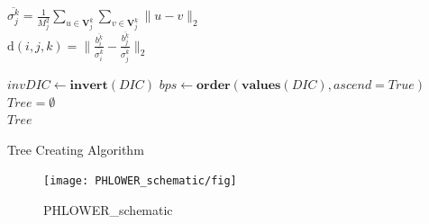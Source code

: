 \begin{algorithm}
{{{                $\overline{\sigma^k_j} = \frac{1}{M_j^2} \sum_{u \in \mathbf{V}^k_j}  \sum_{v \in \mathbf{V}^k_j} \Big\|u-v\Big\|_2$\\
                $\mathrm{d}(i,j,k) = \Bigg\| \frac{ \overline{b^k_i} }{ \overline{\sigma^k_i}} - \frac{ \overline{b^k_j} }{ \overline{\sigma^k_j}} \Bigg\|_2$\\
            }
        }
    }
    
    $invDIC \gets \textbf{invert}(DIC)$ 
    $bps \gets \textbf{order}(\textbf{values}(DIC), ascend=True)$ 
    $Tree = \emptyset$\\
    \Return $Tree$
    \caption{Tree Creating Algorithm}
    \label{alg:treecreating}
\end{algorithm}

\begin{figure}[!ht]
	\centering
	\texttt{[image: PHLOWER\_schematic/fig]}
	\vspace{0.1cm}
	\caption[PHLOWER\_schematic.]{PHLOWER\_schematic}
	\label{fig:PHLOWER_schematic}
\end{figure}

